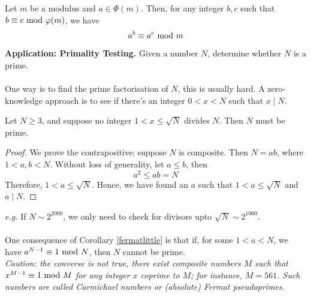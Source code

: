 \begin{corollary}
Let $m$ be a modulus and $a \in \Phi(m)$. Then, for any integer $b,c$ such that $b \equiv c \text{ mod }{\varphi(m)}$, we have
\[a^b \equiv a^c\text{ mod }{m}\]
\end{corollary}

\vspace*{2em}

{\bf Application: Primality Testing.} Given a number $N$, determine whether $N$ is a prime.\\
\\
One way is to find the prime factorisation of $N$, this is usually hard. A zero-knowledge approach is to see if there's an integer $0 < x < N$ such that $x\mid N$.

\vspace*{0.5em}

\begin{proposition}
Let $N\geq 3$, and suppose no integer $1 < x \leq \sqrt{N}$ divides $N$. Then $N$ must be prime.
\end{proposition}
\begin{proof}
We prove the contrapositive; suppose $N$ is composite. Then $N = ab$, where $1<a,b<N$. Without loss of generality, let $a\leq b$, then
\[a^2 \leq ab = N\]
Therefore, $1 < a \leq \sqrt{N}$. Hence, we have found an $a$ such that $1< a\leq \sqrt{N}$ and $a\mid N$.
\end{proof}

\vspace*{0.5em}

\emph{e.g.} If $N \sim 2^{2000}$, we only need to check for divisors upto $\sqrt{N} \sim 2^{1000}$.\\
\\[0.5em]
One consequence of Corollary \ref{fermatlittle} is that if, for some $1 < a < N$, we have $a^{N-1} \equiv 1\text{ mod }{N}$, then $N$ cannot be prime.\\[0.5em]
\emph{Caution: the converse is not true, there exist composite numbers $M$ such that $x^{M-1} \equiv 1\text{ mod }{M}$ for any integer $x$ coprime to $M$; for instance, $M = 561$. Such numbers are called \emph{Carmichael numbers} or (absolute) Fermat pseudoprimes.}

\vspace*{1.5em}

